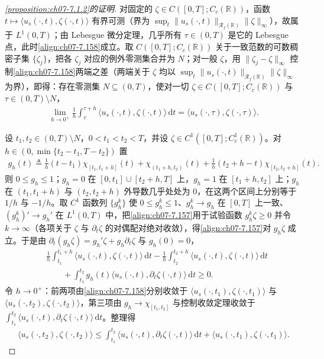 \documentclass[../../main.tex]{subfiles}%
\begin{document}
\begin{proof}[\cref{proposition:ch07-7.1.2}的证明]
对固定的 $\zeta\in C([0,T];C_c(\mathbb{R}))$，函数 $t\mapsto\langle u_s(\cdot,t),\zeta(\cdot,t)\rangle$ 有界可测（界为 $\sup_t\|u_s(\cdot,t)\|_{\mathscr{R}_f(\mathbb{R})}\|\zeta\|_\infty$），故属于 $L^1(0,T)$；由 Lebesgue 微分定理，几乎所有 $\tau\in(0,T)$ 是它的 Lebesgue 点，此时\eqref{align:ch07-7.158}成立。取 $C([0,T];C_c(\mathbb{R}))$ 关于一致范数的可数稠密子集 $\{\zeta_j\}$，把各 $\zeta_j$ 对应的例外零测集合并为 $N$；对一般 $\zeta$，用 $\|\zeta_j-\zeta\|_\infty$ 控制\eqref{align:ch07-7.158}两端之差（两端关于 $\zeta$ 均以 $\sup_t\|u_s(\cdot,t)\|_{\mathscr{R}_f(\mathbb{R})}\|\zeta\|_\infty$ 为界），即得：存在零测集 $N\subseteq(0,T)$，使对一切 $\zeta\in C([0,T];C_c(\mathbb{R}))$ 与 $\tau\in(0,T)\setminus N$，
\begin{align}
\lim_{h\to0^+}\frac1h\int_\tau^{\tau+h}\langle u_s(\cdot,t),\zeta(\cdot,t)\rangle\,\mathrm{d}t=\langle u_s(\cdot,\tau),\zeta(\cdot,\tau)\rangle . \label{align:ch07-7.158}
\end{align}

设 $t_1,t_2\in(0,T)\setminus N$，$0<t_1<t_2<T$，并设 $\zeta\in C^1([0,T];C_c^1(\mathbb{R}))$。对 $h\in(0,\min\{t_2-t_1,T-t_2\})$ 置
\begin{align*}
g_h(t)\triangleq\frac1h(t-t_1)\chi_{[t_1,t_1+h]}(t)+\chi_{(t_1+h,t_2)}(t)+\frac1h(t_2+h-t)\chi_{[t_2,t_2+h]}(t).
\end{align*}
则 $0\leqslant g_h\leqslant1$；$g_h=0$ 在 $[0,t_1]\cup[t_2+h,T]$ 上，$g_h=1$ 在 $[t_1+h,t_2]$ 上；$g_h$ 在 $(t_1,t_1+h)$ 与 $(t_2,t_2+h)$ 外导数几乎处处为 $0$，在这两个区间上分别等于 $1/h$ 与 $-1/h$。取 $C^1$ 函数列 $\{g_h^k\}$ 使 $0\leqslant g_h^k\leqslant1$、$g_h^k\to g_h$ 在 $[0,T]$ 上一致、$(g_h^k)'\to g_h'$ 在 $L^1(0,T)$ 中，把\eqref{align:ch07-7.157}用于试验函数 $g_h^k\zeta\geqslant0$ 并令 $k\to\infty$（各项关于 $\zeta$ 与 $\partial_t\zeta$ 的对偶配对绝对收敛），得\eqref{align:ch07-7.157}对 $g_h\zeta$ 成立。于是由 $\partial_t(g_h\zeta)=g_h'\zeta+g_h\partial_t\zeta$ 与 $g_h(0)=0$，
\begin{align*}
&\frac1h\int_{t_1}^{t_1+h}\langle u_s(\cdot,t),\zeta(\cdot,t)\rangle\,\mathrm{d}t-\frac1h\int_{t_2}^{t_2+h}\langle u_s(\cdot,t),\zeta(\cdot,t)\rangle\,\mathrm{d}t\\
&\qquad+\int_{t_1}^{t_2}g_h(t)\langle u_s(\cdot,t),\partial_t\zeta(\cdot,t)\rangle\,\mathrm{d}t\geqslant0 .
\end{align*}
令 $h\to0^+$：前两项由\eqref{align:ch07-7.158}分别收敛于 $\langle u_s(\cdot,t_1),\zeta(\cdot,t_1)\rangle$ 与 $\langle u_s(\cdot,t_2),\zeta(\cdot,t_2)\rangle$，第三项由 $g_h\to\chi_{[t_1,t_2]}$ 与控制收敛定理收敛于 $\int_{t_1}^{t_2}\langle u_s(\cdot,t),\partial_t\zeta(\cdot,t)\rangle\,\mathrm{d}t$。整理得
\begin{align}
\langle u_s(\cdot,t_2),\zeta(\cdot,t_2)\rangle\leqslant\int_{t_1}^{t_2}\langle u_s(\cdot,t),\partial_t\zeta(\cdot,t)\rangle\,\mathrm{d}t+\langle u_s(\cdot,t_1),\zeta(\cdot,t_1)\rangle . \label{align:ch07-7.159}
\end{align}


\end{proof}
\end{document}
